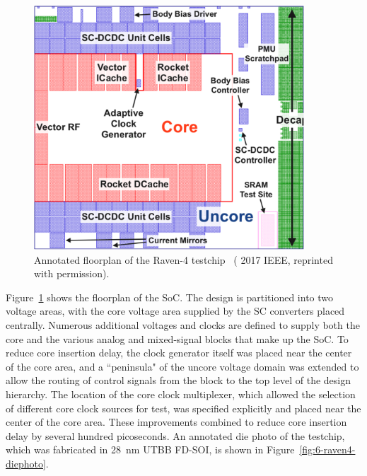 \documentclass[graybox]{svmult}
\begin{document}
\begin{figure}
  \centering
  \includegraphics[width=0.9\textwidth]{6-raven4-floorplan}
  \caption{Annotated floorplan of the Raven-4 testchip~\cite{Keller2017} ({\textcopyright} 2017 IEEE, reprinted with permission).}
  \label{fig:6-raven4-floorplan}
\end{figure}

Figure~\ref{fig:6-raven4-floorplan} shows the floorplan of the SoC.
The design is partitioned into two voltage areas, with the core voltage area supplied by the SC converters placed centrally.
Numerous additional voltages and clocks are defined to supply both the core and the various analog and mixed-signal blocks that make up the SoC.
To reduce core insertion delay, the clock generator itself was placed near the center of the core area, and a ``peninsula" of the uncore voltage domain was extended to allow the routing of control signals from the block to the top level of the design hierarchy.
The location of the core clock multiplexer, which allowed the selection of different core clock sources for test, was specified explicitly and placed near the center of the core area.
These improvements combined to reduce core insertion delay by several hundred picoseconds.
An annotated die photo of the testchip, which was fabricated in \SI{28}{\nano\meter} UTBB FD-SOI, is shown in Figure~\ref{fig:6-raven4-diephoto}.
\end{document}
